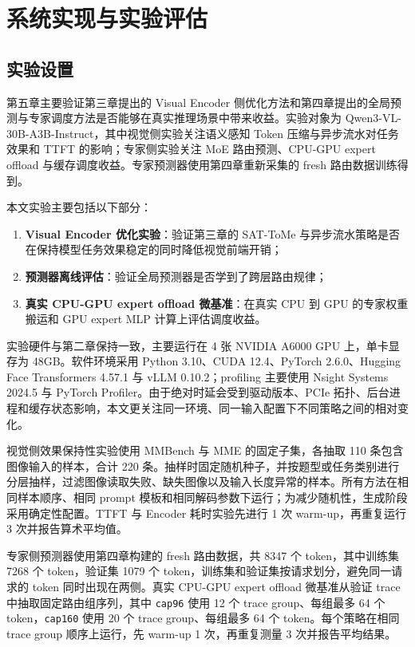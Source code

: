 \chapter{系统实现与实验评估}
\label{chap:experiments}

\section{实验设置}
第五章主要验证第三章提出的 Visual Encoder 侧优化方法和第四章提出的全局预测与专家调度方法是否能够在真实推理场景中带来收益。实验对象为 Qwen3-VL-30B-A3B-Instruct\cite{bai2025qwen3vl}，其中视觉侧实验关注语义感知 Token 压缩与异步流水对任务效果和 TTFT 的影响；专家侧实验关注 MoE 路由预测、CPU-GPU expert offload 与缓存调度收益。专家预测器使用第四章重新采集的 fresh 路由数据训练得到。

本文实验主要包括以下部分：
\begin{enumerate}
    \item \textbf{Visual Encoder 优化实验}：验证第三章的 SAT-ToMe 与异步流水策略是否在保持模型任务效果稳定的同时降低视觉前端开销；
    \item \textbf{预测器离线评估}：验证全局预测器是否学到了跨层路由规律；
    \item \textbf{真实 CPU-GPU expert offload 微基准}：在真实 CPU 到 GPU 的专家权重搬运和 GPU expert MLP 计算上评估调度收益。
\end{enumerate}

实验硬件与第二章保持一致，主要运行在 4 张 NVIDIA A6000 GPU 上，单卡显存为 48GB。软件环境采用 Python 3.10、CUDA 12.4、PyTorch 2.6.0、Hugging Face Transformers 4.57.1 与 vLLM 0.10.2；profiling 主要使用 Nsight Systems 2024.5 与 PyTorch Profiler。由于绝对时延会受到驱动版本、PCIe 拓扑、后台进程和缓存状态影响，本文更关注同一环境、同一输入配置下不同策略之间的相对变化。

视觉侧效果保持性实验使用 MMBench 与 MME 的固定子集，各抽取 110 条包含图像输入的样本，合计 220 条。抽样时固定随机种子，并按题型或任务类别进行分层抽样，过滤图像读取失败、缺失图像以及输入长度异常的样本。所有方法在相同样本顺序、相同 prompt 模板和相同解码参数下运行；为减少随机性，生成阶段采用确定性配置。TTFT 与 Encoder 耗时实验先进行 1 次 warm-up，再重复运行 3 次并报告算术平均值。

专家侧预测器使用第四章构建的 fresh 路由数据，共 8347 个 token，其中训练集 7268 个 token，验证集 1079 个 token，训练集和验证集按请求划分，避免同一请求的 token 同时出现在两侧。真实 CPU-GPU expert offload 微基准从验证 trace 中抽取固定路由组序列，其中 \texttt{cap96} 使用 12 个 trace group、每组最多 64 个 token，\texttt{cap160} 使用 20 个 trace group、每组最多 64 个 token。每个策略在相同 trace group 顺序上运行，先 warm-up 1 次，再重复测量 3 次并报告平均结果。

